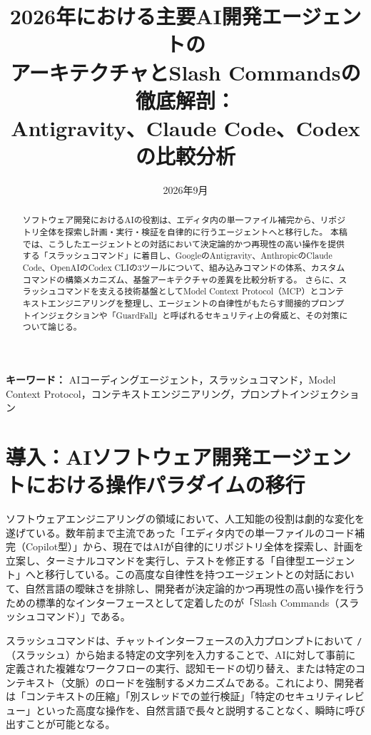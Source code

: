 \documentclass[a4paper,11pt]{ltjsarticle}
\title{2026年における主要AI開発エージェントの\\アーキテクチャとSlash Commandsの徹底解剖：\\Antigravity、Claude Code、Codexの比較分析}
\author{}
\date{2026年9月}
\newcommand{\cmd}[1]{\texttt{#1}}
\begin{document}
\maketitle

\begin{abstract}
ソフトウェア開発におけるAIの役割は、エディタ内の単一ファイル補完から、リポジトリ全体を探索し計画・実行・検証を自律的に行うエージェントへと移行した。
本稿では、こうしたエージェントとの対話において決定論的かつ再現性の高い操作を提供する「スラッシュコマンド」に着目し、GoogleのAntigravity、AnthropicのClaude Code、OpenAIのCodex CLIの3ツールについて、組み込みコマンドの体系、カスタムコマンドの構築メカニズム、基盤アーキテクチャの差異を比較分析する。
さらに、スラッシュコマンドを支える技術基盤としてModel Context Protocol（MCP）とコンテキストエンジニアリングを整理し、エージェントの自律性がもたらす間接的プロンプトインジェクションや「GuardFall」と呼ばれるセキュリティ上の脅威と、その対策について論じる。
\end{abstract}

\noindent\textbf{キーワード：} AIコーディングエージェント，スラッシュコマンド，Model Context Protocol，コンテキストエンジニアリング，プロンプトインジェクション

\section{導入：AIソフトウェア開発エージェントにおける操作パラダイムの移行}

ソフトウェアエンジニアリングの領域において、人工知能の役割は劇的な変化を遂げている。数年前まで主流であった「エディタ内での単一ファイルのコード補完（Copilot型）」から、現在ではAIが自律的にリポジトリ全体を探索し、計画を立案し、ターミナルコマンドを実行し、テストを修正する「自律型エージェント」へと移行している\cite{r1}。この高度な自律性を持つエージェントとの対話において、自然言語の曖昧さを排除し、開発者が決定論的かつ再現性の高い操作を行うための標準的なインターフェースとして定着したのが「Slash Commands（スラッシュコマンド）」である\cite{r3}。

スラッシュコマンドは、チャットインターフェースの入力プロンプトにおいて \cmd{/}（スラッシュ）から始まる特定の文字列を入力することで、AIに対して事前に定義された複雑なワークフローの実行、認知モードの切り替え、または特定のコンテキスト（文脈）のロードを強制するメカニズムである\cite{r6}。これにより、開発者は「コンテキストの圧縮」「別スレッドでの並行検証」「特定のセキュリティレビュー」といった高度な操作を、自然言語で長々と説明することなく、瞬時に呼び出すことが可能となる\cite{r8}。
\end{document}
